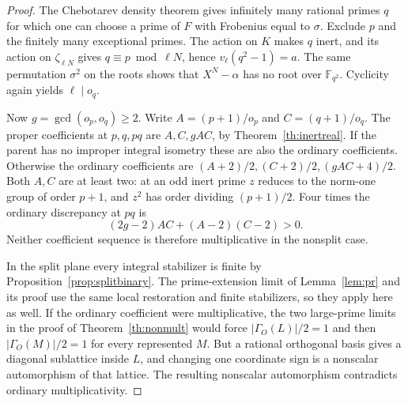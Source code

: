 \begin{proof}
The Chebotarev density theorem \cite{StevenhagenLenstra} gives
infinitely many rational primes \(q\) for which one can choose a
prime of \(F\) with Frobenius equal to \(\sigma\).
Exclude \(p\) and the finitely many exceptional primes.
The action on \(K\) makes \(q\) inert, and its action on \(\zeta_{\ell N}\)
gives \(q\equiv p\bmod\ell N\), hence \(v_\ell(q^2-1)=a\).
The same permutation \(\sigma^2\) on the roots shows that \(X^N-\alpha\)
has no root over \(\mathbb F_{q^2}\). Cyclicity again yields \(\ell\mid o_q\).

Now \(g=\gcd(o_p,o_q)\ge2\). Write \(A=(p+1)/o_p\) and \(C=(q+1)/o_q\).
The proper coefficients at \(p,q,pq\) are \(A,C,gAC\), by Theorem~\ref{th:inertreal}.
If the parent has no improper integral isometry these are also the ordinary coefficients.
Otherwise the ordinary coefficients are \((A+2)/2,(C+2)/2,(gAC+4)/2\).
Both \(A,C\) are at least two: at an odd inert prime \(z\) reduces to the norm-one
group of order \(p+1\), and \(z^2\) has order dividing \((p+1)/2\).
Four times the ordinary discrepancy at \(pq\) is
\[
 (2g-2)AC+(A-2)(C-2)>0 .
\]
Neither coefficient sequence is therefore multiplicative in the nonsplit case.

In the split plane every integral stabilizer is finite by
Proposition~\ref{prop:splitbinary}. The prime-extension limit of
Lemma~\ref{lem:pr} and its proof use the same local restoration and
finite stabilizers, so they apply here as well.
If the ordinary coefficient were multiplicative, the two large-prime
limits in the proof of Theorem~\ref{th:nonmult} would force
\(|\Gamma_O(L)|/2=1\) and then \(|\Gamma_O(M)|/2=1\) for every represented \(M\).
But a rational orthogonal basis gives a diagonal sublattice inside \(L\),
and changing one coordinate sign is a nonscalar automorphism of that lattice.
The resulting nonscalar automorphism contradicts ordinary
multiplicativity.


\end{proof}
